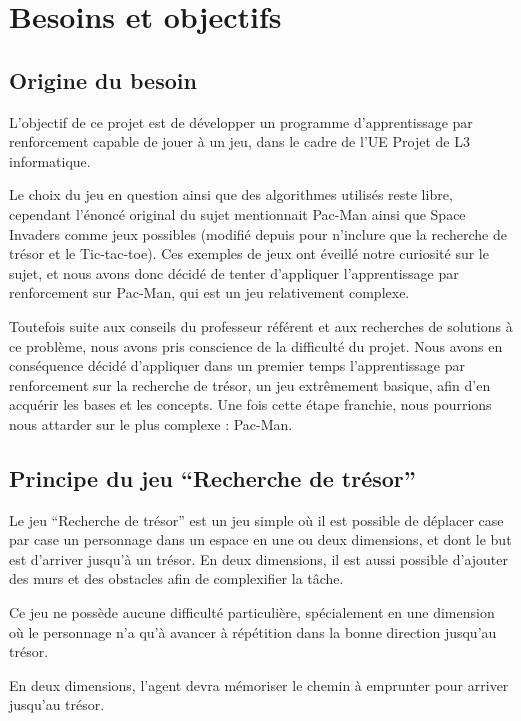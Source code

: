 
\chapter{Besoins et objectifs}

\section{Origine du besoin}

L'objectif de ce projet est de développer un programme d’apprentissage par renforcement capable de jouer à un jeu, dans le cadre de l’UE Projet de L3 informatique. 
\par
Le choix du jeu en question ainsi que des algorithmes utilisés reste libre, cependant l'énoncé original du sujet mentionnait Pac-Man ainsi que Space Invaders comme jeux possibles (modifié depuis pour n'inclure que la recherche de trésor et le Tic-tac-toe). Ces exemples de jeux ont éveillé notre curiosité sur le sujet, et nous avons donc décidé de tenter d'appliquer l'apprentissage par renforcement sur Pac-Man, qui est un jeu relativement complexe.
\par
Toutefois suite aux conseils du professeur référent et aux recherches de solutions à ce problème, nous avons pris conscience de la difficulté du projet. Nous avons en conséquence décidé d'appliquer dans un premier temps l'apprentissage par renforcement sur la recherche de trésor, un jeu extrêmement basique, afin d'en acquérir les bases et les concepts. Une fois cette étape franchie, nous pourrions nous attarder sur le plus complexe : Pac-Man.

\section{Principe du jeu ``Recherche de trésor''}

Le jeu “Recherche de trésor” est un jeu simple où il est possible de déplacer case par case un personnage dans un espace en une ou deux dimensions, et dont le but est d’arriver jusqu’à un trésor. En deux dimensions, il est aussi possible d’ajouter des murs et des obstacles afin de complexifier la tâche. 
\par
Ce jeu ne possède aucune difficulté particulière, spécialement en une dimension où le personnage n'a qu'à avancer à répétition dans la bonne direction jusqu'au trésor.
\par
En deux dimensions, l'agent devra mémoriser le chemin à emprunter pour arriver jusqu'au trésor.

